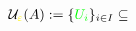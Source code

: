 \documentclass[preview]{standalone}
\begin{document}
\begin{align*}
\mathcal{U}_{\textcolor{yellow}{\varepsilon}}(A) :=  \{\textcolor{green}{U_i}\}_{i \in I} \subseteq
\end{align*}
\end{document}
